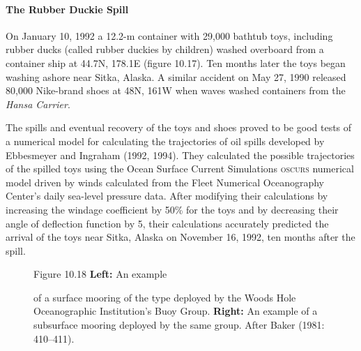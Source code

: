 \paragraph{The Rubber Duckie Spill}
On January 10, 1992 a 12.2-m container with
29,000 bathtub toys, including rubber ducks (called rubber duckies by
children) washed overboard from a container ship at 44.7\degrees N,
178.1\degrees E (figure 10.17). Ten months later the toys began
washing ashore near Sitka, Alaska. A similar accident on May 27, 1990
released 80,000 Nike-brand shoes at 48\degrees N, 161\degrees W when
waves washed containers from the \textit{Hansa Carrier}.

The spills and eventual recovery of the toys and shoes proved to be
good tests of a numerical model for calculating the trajectories of
oil spills developed by Ebbesmeyer and Ingraham (1992, 1994). They
calculated the possible trajectories of the spilled toys using the
Ocean Surface Current Simulations \textsc{oscurs} numerical model
driven by winds calculated from the Fleet Numerical Oceanography
Center's daily sea-level pressure data. After modifying their
calculations by increasing the windage coefficient by 50\% for the
toys and by decreasing their angle of deflection function by
5\degrees, their calculations accurately predicted the arrival of the
toys near Sitka, Alaska on November 16,
1992, ten months after the spill.

\begin{figure}[b!]
\vspace{-3ex}
\footnotesize
Figure 10.18 \textbf{Left:} An example \rule{0mm}{3ex}of a surface
mooring of the type deployed by the Woods Hole Oceanographic
Institution's Buoy Group.  \textbf{Right:} An example of a subsurface
mooring deployed by the same group.  After Baker (1981: 410--411).
\label{fig:moorings}
\end{figure}

